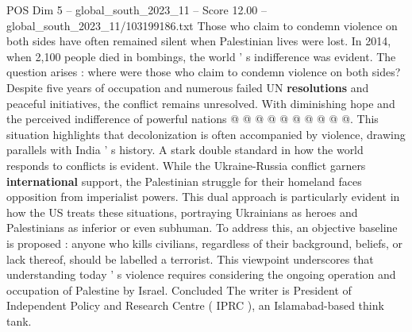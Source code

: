 \begin{textsample}{POS Dim 5 – global\_south\_2023\_11 – Score 12.00 – global\_south\_2023\_11/103199186.txt}
Those who claim to condemn violence on both sides have often remained silent when Palestinian lives were lost.
In 2014, when 2,100 people died in bombings, the world ' s indifference was evident.
The question arises : where were those who claim to condemn violence on both sides?
Despite five years of occupation and numerous failed UN \textbf{resolutions} and peaceful initiatives, the conflict remains unresolved.
With diminishing hope and the perceived indifference of powerful nations @ @ @ @ @ @ @ @ @ @.
This situation highlights that decolonization is often accompanied by violence, drawing parallels with India ' s history.
A stark double standard in how the world responds to conflicts is evident.
While the Ukraine-Russia conflict garners \textbf{international} support, the Palestinian struggle for their homeland faces opposition from imperialist powers.
This dual approach is particularly evident in how the US treats these situations, portraying Ukrainians as heroes and Palestinians as inferior or even subhuman.
To address this, an objective baseline is proposed : anyone who kills civilians, regardless of their background, beliefs, or lack thereof, should be labelled a terrorist.
This viewpoint underscores that understanding today ' s violence requires considering the ongoing operation and occupation of Palestine by Israel.
Concluded The writer is President of Independent Policy and Research Centre ( IPRC ), an Islamabad-based think tank.

\end{textsample}
